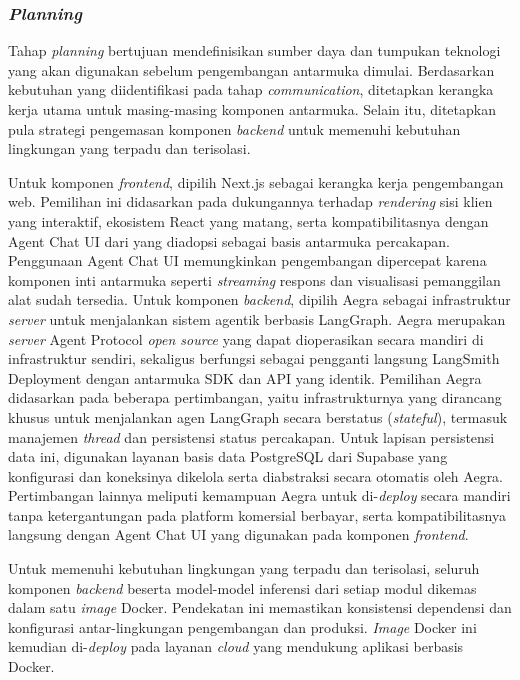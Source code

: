 \subsubsection{\textit{Planning}}
Tahap \textit{planning} bertujuan mendefinisikan sumber daya dan tumpukan teknologi yang akan digunakan sebelum pengembangan antarmuka dimulai. Berdasarkan kebutuhan yang diidentifikasi pada tahap \textit{communication}, ditetapkan kerangka kerja utama untuk masing-masing komponen antarmuka. Selain itu, ditetapkan pula strategi pengemasan komponen \textit{backend} untuk memenuhi kebutuhan lingkungan yang terpadu dan terisolasi.

Untuk komponen \textit{frontend}, dipilih Next.js \parencite{vercel_nextjs} sebagai kerangka kerja pengembangan web. Pemilihan ini didasarkan pada dukungannya terhadap \textit{rendering} sisi klien yang interaktif, ekosistem React yang matang, serta kompatibilitasnya dengan Agent Chat UI dari \textcite{langchainLangchainaiAgentchatui2026} yang diadopsi sebagai basis antarmuka percakapan. Penggunaan Agent Chat UI memungkinkan pengembangan dipercepat karena komponen inti antarmuka seperti \textit{streaming} respons dan visualisasi pemanggilan alat sudah tersedia. Untuk komponen \textit{backend}, dipilih Aegra \parencite{ibbybuilds_aegra} sebagai infrastruktur \textit{server} untuk menjalankan sistem agentik berbasis LangGraph. Aegra merupakan \textit{server} Agent Protocol \textit{open source} yang dapat dioperasikan secara mandiri di infrastruktur sendiri, sekaligus berfungsi sebagai pengganti langsung LangSmith Deployment dengan antarmuka SDK dan API yang identik. Pemilihan Aegra didasarkan pada beberapa pertimbangan, yaitu infrastrukturnya yang dirancang khusus untuk menjalankan agen LangGraph secara berstatus (\textit{stateful}), termasuk manajemen \textit{thread} dan persistensi status percakapan. Untuk lapisan persistensi data ini, digunakan layanan basis data PostgreSQL dari Supabase \parencite{supabase_github} yang konfigurasi dan koneksinya dikelola serta diabstraksi secara otomatis oleh Aegra. Pertimbangan lainnya meliputi kemampuan Aegra untuk di-\textit{deploy} secara mandiri tanpa ketergantungan pada platform komersial berbayar, serta kompatibilitasnya langsung dengan Agent Chat UI yang digunakan pada komponen \textit{frontend}. 

Untuk memenuhi kebutuhan lingkungan yang terpadu dan terisolasi, seluruh komponen \textit{backend} beserta model-model inferensi dari setiap modul dikemas dalam satu \textit{image} Docker. Pendekatan ini memastikan konsistensi dependensi dan konfigurasi antar-lingkungan pengembangan dan produksi. \textit{Image} Docker ini kemudian di-\textit{deploy} pada layanan \textit{cloud} yang mendukung aplikasi berbasis Docker.

